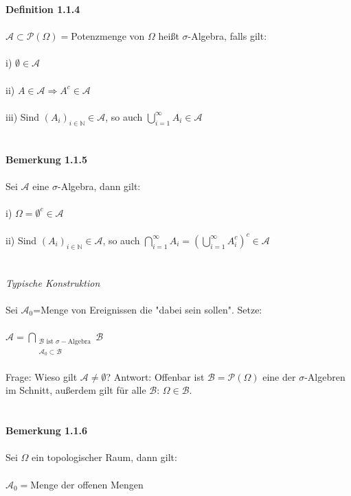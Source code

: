 \documentclass[10pt,a4paper]{report}
\numberwithin{equation}{section}
\numberwithin{figure}{section}
\theoremstyle{plain}
\theoremstyle{definition}
\theoremstyle{plain}
\theoremstyle{definition}
\theoremstyle{remark}
\theoremstyle{plain}
\begin{document}
\textbf{Definition 1.1.4}\\\\
$\mathcal{A}\subset \mathcal{P}(\Omega)=$Potenzmenge von $\Omega$ heißt $\sigma$-Algebra, falls gilt:\\\\
i) $\emptyset \in \mathcal{A}$\\\\
ii) $A\in \mathcal{A} \Rightarrow A^c \in \mathcal{A}$\\\\
iii) Sind $(A_i)_{i \in \mathbb{N}} \in \mathcal{A}$, so auch $\bigcup\limits_{i=1}^\infty A_i \in \mathcal{A}$\\\\\\
\textbf{Bemerkung 1.1.5}\\\\
Sei $\mathcal{A}$ eine $\sigma$-Algebra, dann gilt:\\\\
i) $\Omega=\emptyset^c \in \mathcal{A}$\\\\
ii) Sind $(A_i)_{i \in \mathbb{N}} \in \mathcal{A}$, so auch $\bigcap\limits_{i=1}^\infty A_i=\left(\bigcup\limits_{i=1}^\infty A_i^c\right)^c \in \mathcal{A}$\\\\\\
\textit{Typische Konstruktion}\\\\
Sei $\mathcal{A}_0$=Menge von Ereignissen die "dabei sein sollen". Setze:\\\\
$\mathcal{A}=\bigcap\limits_{\substack{\mathcal{B} \text{ ist }  \sigma-\text{Algebra}\\ \mathcal{A}_0\subset \mathcal{B}}}\mathcal{B}$\\\\
Frage: Wieso gilt $\mathcal{A}\neq \emptyset$? Antwort: Offenbar ist $\mathcal{B}=\mathcal{P}(\Omega)$ eine der $\sigma$-Algebren im Schnitt, außerdem gilt für alle $\mathcal{B}$: $\Omega \in \mathcal{B}$.\\\\\\
\textbf{Bemerkung 1.1.6}\\\\
Sei $\Omega$ ein topologischer Raum, dann gilt:\\\\
$\mathcal{A}_0=$Menge der offenen Mengen \\\\
\end{document}
